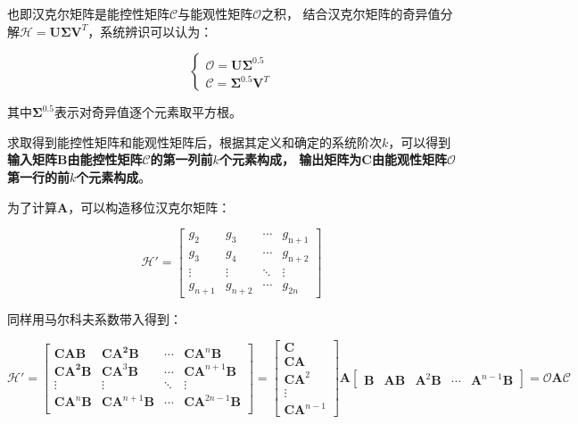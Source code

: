 也即汉克尔矩阵是能控性矩阵\(\bm{\mathcal{C}}\)与能观性矩阵\(\bm{\mathcal{O}}\)之积，
结合汉克尔矩阵的奇异值分解\(\bm{\mathcal{H}}=\bm{U}\bm{\Sigma}\bm{V}^T\)，系统辨识可以认为：

\begin{equation*}
    \begin{cases}
        \bm{\mathcal{O}}=\bm{U}\bm{\Sigma}^{0.5} \\
        \bm{\mathcal{C}}=\bm{\Sigma}^{0.5}\bm{V}^T
    \end{cases}
\end{equation*}

其中\(\bm{\Sigma}^{0.5}\)表示对奇异值逐个元素取平方根。

求取得到能控性矩阵和能观性矩阵后，根据其定义和确定的系统阶次\(k\)，可以得到
\textbf{输入矩阵\(\bm{B}\)由能控性矩阵\(\bm{\mathcal{C}}\)的第一列前\(k\)个元素构成，
输出矩阵为\(\bm{C}\)由能观性矩阵\(\bm{\mathcal{O}}\)第一行的前\(k\)个元素构成}。

为了计算\(\bm{A}\)，可以构造移位汉克尔矩阵：

\begin{equation*}
    \bm{\mathcal{H'}}=
    \begin{bmatrix}
        g_2 & g_3 & \cdots & g_{\mathrm{n+1}} \\
        g_3 & g_4 & \cdots & g_{\mathrm{n+2}} \\
        \vdots & \vdots & \ddots & \vdots \\
        g_{n+1} & g_{n+2} & \cdots & g_{2n}
    \end{bmatrix}
\end{equation*}

同样用马尔科夫系数带入得到：

\begin{equation*}
    \bm{\mathcal{H'}}
    =
    \begin{bmatrix}
        \bm{CAB} & \bm{CA^2}\bm{B} & \cdots & \bm{CA}^{n}\bm{B} \\
        \bm{CA^2}\bm{B} & \bm{CA}^3\bm{B} & \cdots & \bm{CA}^{n+1}\bm{B} \\
        \vdots & \vdots & \ddots & \vdots \\
        \bm{CA}^{n}\bm{B} & \bm{CA}^{n+1}\bm{B} & \cdots & \bm{CA}^{2n-1}\bm{B} \\
    \end{bmatrix}
    =
    \begin{bmatrix}
        \bm{C}\\\bm{CA}\\\bm{CA}^2\\\bm{\vdots}\\\bm{CA}^{n-1}
    \end{bmatrix}
    \bm{A}
    \begin{bmatrix}
        \bm{B}&\bm{AB}&\bm{A}^2\bm{B}&\bm{\cdots}&\bm{A}^{n-1}\bm{B}
    \end{bmatrix}
     =\bm{\mathcal{O}A\mathcal{C}}
\end{equation*}

